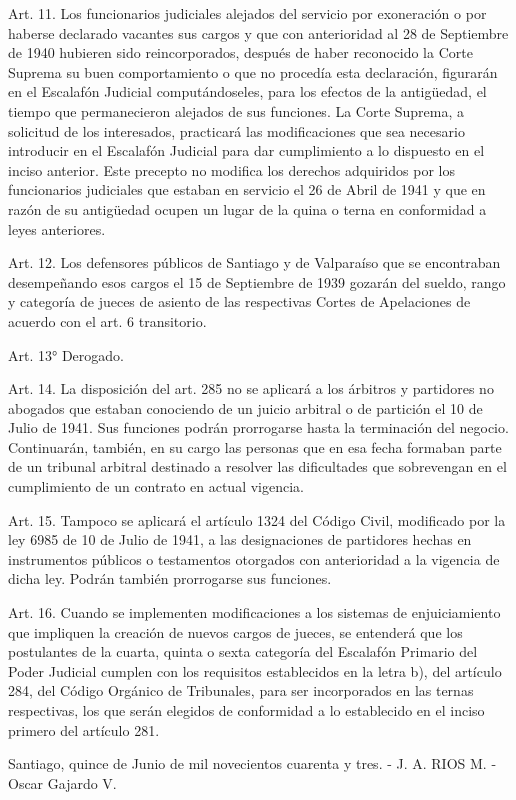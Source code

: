     Art. 11. Los funcionarios judiciales alejados del servicio por exoneración o por haberse declarado vacantes sus cargos y que con anterioridad al 28 de Septiembre de 1940 hubieren sido reincorporados, después de haber reconocido la Corte Suprema su buen comportamiento o que no procedía esta declaración, figurarán en el Escalafón Judicial computándoseles, para los efectos de la antigüedad, el tiempo que permanecieron alejados de sus funciones.
    La Corte Suprema, a solicitud de los interesados, practicará las modificaciones que sea necesario introducir en el Escalafón Judicial para dar cumplimiento a lo dispuesto en el inciso anterior.
    Este precepto no modifica los derechos adquiridos por los funcionarios judiciales que estaban en servicio el 26 de Abril de 1941 y que en razón de su antigüedad ocupen un lugar de la quina o terna en conformidad a leyes anteriores.


    Art. 12. Los defensores públicos de Santiago y de Valparaíso que se encontraban desempeñando esos cargos el 15 de Septiembre de 1939 gozarán del sueldo, rango y categoría de jueces de asiento de las respectivas Cortes de Apelaciones de acuerdo con el art. 6 transitorio.

    Art. 13° Derogado.

    Art. 14. La disposición del art. 285 no se aplicará a los árbitros y partidores no abogados que estaban conociendo de un juicio arbitral o de partición el 10 de Julio de 1941. Sus funciones podrán prorrogarse hasta la terminación del negocio.
    Continuarán, también, en su cargo las personas que en esa fecha formaban parte de un tribunal arbitral destinado a resolver las dificultades que sobrevengan en el cumplimiento de un contrato en actual vigencia.


    Art. 15. Tampoco se aplicará el artículo 1324 del Código Civil, modificado por la ley 6985 de 10 de Julio de 1941, a las designaciones de partidores hechas en instrumentos públicos o testamentos otorgados con anterioridad a la vigencia de dicha ley. Podrán también prorrogarse sus funciones.

    Art. 16. Cuando se implementen modificaciones a los sistemas de enjuiciamiento que impliquen la creación de nuevos cargos de jueces, se entenderá que los postulantes de la cuarta, quinta o sexta categoría del Escalafón Primario del Poder Judicial cumplen con los requisitos establecidos en la letra b), del artículo 284, del Código Orgánico de Tribunales, para ser incorporados en las ternas respectivas, los que serán elegidos de conformidad a lo establecido en el inciso primero del artículo 281.

    Santiago, quince de Junio de mil novecientos cuarenta y tres. - J. A. RIOS M. -Oscar Gajardo V.